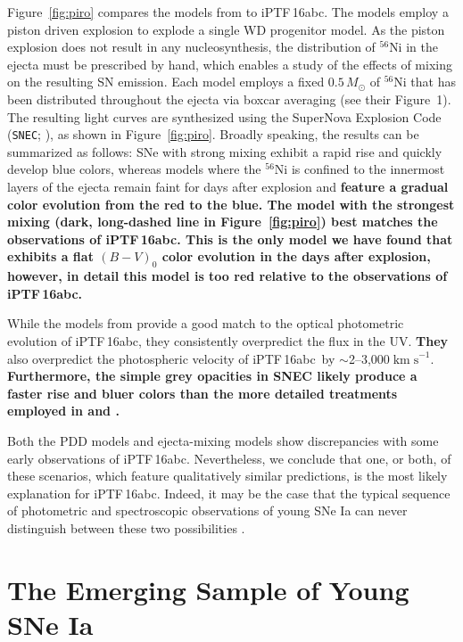 \documentclass[twocolumn]{aastex61}
\newcommand{\sm}{M_\odot}
\newcommand{\abc}{iPTF\,16abc}
\newcommand{\sneia}{SNe Ia}
\begin{document}
Figure~\ref{fig:piro} compares the models from \citet{2016ApJ...826...96P} to
\abc. The \citeauthor{2016ApJ...826...96P} models employ a piston driven
explosion to explode a single WD progenitor model. As the piston explosion
does not result in any nucleosynthesis, the distribution of $^{56}$Ni in the
ejecta must be prescribed by hand, which enables a study of the effects of
mixing on the resulting SN emission. Each model employs a fixed $0.5\,\sm$ of
$^{56}$Ni that has been distributed throughout the ejecta via boxcar averaging
(see their Figure~1). The resulting light curves are synthesized using the
SuperNova Explosion Code (\texttt{SNEC}; \citealt{2015ApJ...814...63M}), as
shown in Figure~\ref{fig:piro}. Broadly speaking, the results can be
summarized as follows: SNe with strong mixing exhibit a rapid rise and quickly
develop blue colors, whereas models where the $^{56}$Ni is confined to the
innermost layers of the ejecta remain faint for days after explosion and
\textbf{feature a gradual color evolution from the red to the blue. The model
with the strongest mixing (dark, long-dashed line in Figure~\ref{fig:piro})
best matches the observations of \abc. This is the only model we have found
that exhibits a flat $(B-V)_0$ color evolution in the days after explosion,
however, in detail this model is too red relative to the observations of \abc.
}

While the models from \citet{2016ApJ...826...96P} provide a good match to the
optical photometric evolution of \abc, they consistently overpredict the flux
in the UV. \textbf{They} also overpredict the photospheric velocity of \abc\
by $\sim$2--3,000$\; \mathrm{km \; s}^{-1}$. \textbf{Furthermore, the simple
grey opacities in SNEC likely produce a faster rise and bluer colors than the
more detailed treatments employed in \citet{2014MNRAS.441..532D} and
\citet{2017MNRAS.472.2787N}.}

Both the PDD models and ejecta-mixing models show discrepancies with some
early observations of \abc. Nevertheless, we conclude that one, or both, of
these scenarios, which feature qualitatively similar predictions, is the most
likely explanation for \abc. Indeed, it may be the case that the typical
sequence of photometric and spectroscopic observations of young SNe Ia can
never distinguish between these two possibilities \citep{2017MNRAS.472.2787N}.

\section{\textbf{The Emerging Sample of Young \sneia}}
\end{document}
